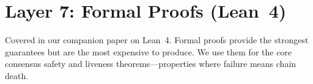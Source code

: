 \section{Layer 7: Formal Proofs (Lean~4)}


Covered in our companion paper on Lean~4. Formal proofs provide the strongest guarantees
but are the most expensive to produce. We use them for the core consensus safety and
liveness theorems---properties where failure means chain death.


